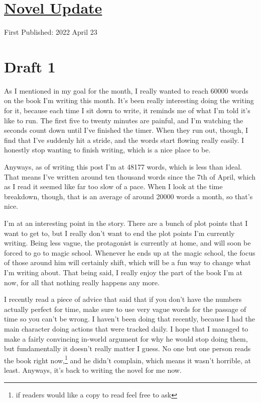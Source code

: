 \documentclass[12pt]{article}[titlepage]
\newcommand{\1}{\={a}}
\newcommand{\2}{\={e}}
\newcommand{\3}{\={\i}}
\newcommand{\4}{\=o}
\newcommand{\5}{\=u}
\newcommand{\6}{\={A}}
\renewcommand{\,}{\textsuperscript{,}}
\begin{document}
\doublespacing
\section{\href{novel-updates-5.html}{Novel Update}}
First Published: 2022 April 23


\section{Draft 1}
As I mentioned in my goal for the month, I really wanted to reach 60000 words on the book I'm writing this month.
It's been really interesting doing the writing for it, because each time I sit down to write, it reminds me of what I'm told it's like to run.
The first five to twenty minutes are painful, and I'm watching the seconds count down until I've finished the timer.
When they run out, though, I find that I've suddenly hit a stride, and the words start flowing really easily.
I honestly stop wanting to finish writing, which is a nice place to be.

Anyways, as of writing this post I'm at 48177 words, which is less than ideal.
That means I've written around ten thousand words since the 7th of April, which as I read it seemed like far too slow of a pace.
When I look at the time breakdown, though, that is an average of around 20000 words a month, so that's nice.

I'm at an interesting point in the story.
There are a bunch of plot points that I want to get to, but I really don't want to end the plot points I'm currently writing.
Being less vague, the protagonist is currently at home, and will soon be forced to go to magic school.
Whenever he ends up at the magic school, the focus of those around him will certainly shift, which will be a fun way to change what I'm writing about.
That being said, I really enjoy the part of the book I'm at now, for all that nothing really happens any more.

I recently read a piece of advice that said that if you don't have the numbers actually perfect for time, make sure to use very vague words for the passage of time so you can't be wrong.
I haven't been doing that recently, because I had the main character doing actions that were tracked daily.
I hope that I managed to make a fairly convincing in-world argument for why he would stop doing them, but fundamentally it doesn't really matter I guess.
No one but one person reads the book right now,\footnote{if readers would like a copy to read feel free to ask} and he didn't complain, which means it wasn't horrible, at least.
Anyways, it's back to writing the novel for me now.
\end{document}
